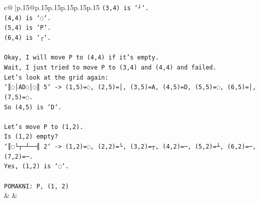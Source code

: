 \documentclass{article}
\begin{document}
{\begin{supertabular}{c@{$\;$}|p{.15\linewidth}@{}p{.15\linewidth}p{.15\linewidth}p{.15\linewidth}p{.15\linewidth}p{.15\linewidth}}
{{{\texttt{(3,4) is `┘`.} \\
\texttt{(4,4) is `◌`.} \\
\texttt{(5,4) is `P`.} \\
\texttt{(6,4) is `┌`.} \\
\\ 
\texttt{Okay, I will move P to (4,4) if it's empty.} \\
\texttt{Wait, I just tried to move P to (3,4) and (4,4) and failed.} \\
\texttt{Let's look at the grid again:} \\
\texttt{`║◌│AD◌│◌║ 5` {-}> (1,5)=◌, (2,5)=│, (3,5)=A, (4,5)=D, (5,5)=◌, (6,5)=│, (7,5)=◌.} \\
\texttt{So (4,5) is `D`.} \\
\\ 
\texttt{Let's move P to (1,2).} \\
\texttt{Is (1,2) empty?} \\
\texttt{`║◌└┬─┴──╢ 2` {-}> (1,2)=◌, (2,2)=└, (3,2)=┬, (4,2)=─, (5,2)=┴, (6,2)=─, (7,2)=─.} \\
\texttt{Yes, (1,2) is `◌`.} \\
\\ 
\texttt{POMAKNI: P, (1, 2)} \\
            }
        }
    }
    & & \\ \\


\end{supertabular}}
\end{document}
